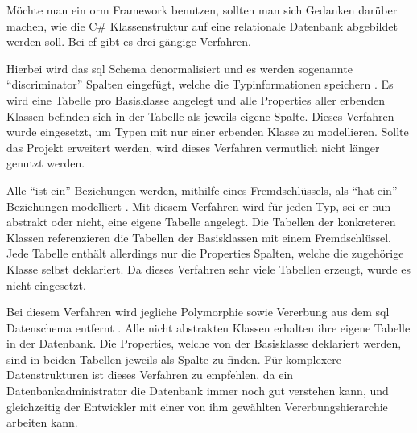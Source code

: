 
Möchte man ein \gls{orm} Framework benutzen, sollten man sich Gedanken darüber machen, wie die C\# Klassenstruktur auf eine relationale Datenbank abgebildet werden soll. Bei \gls{ef} gibt es drei gängige Verfahren.

Hierbei wird das \gls{sql} Schema denormalisiert und es werden sogenannte \enquote{discriminator} Spalten eingefügt, welche die Typinformationen speichern \cite{efTPH}. Es wird eine Tabelle pro Basisklasse angelegt und alle Properties aller erbenden Klassen befinden sich in der Tabelle als jeweils eigene Spalte. Dieses Verfahren wurde eingesetzt, um Typen mit nur einer erbenden Klasse zu modellieren. Sollte das Projekt erweitert werden, wird dieses Verfahren vermutlich nicht länger genutzt werden.

Alle \enquote{ist ein} Beziehungen werden, mithilfe eines Fremdschlüssels, als \enquote{hat ein} Beziehungen modelliert \cite{efTPT}. Mit diesem Verfahren wird für jeden Typ, sei er nun abstrakt oder nicht, eine eigene Tabelle angelegt. Die Tabellen der konkreteren Klassen referenzieren die Tabellen der Basisklassen mit einem Fremdschlüssel. Jede Tabelle enthält allerdings nur die Properties \bzw Spalten, welche die zugehörige Klasse selbst deklariert. Da dieses Verfahren sehr viele Tabellen erzeugt, wurde es nicht eingesetzt.

Bei diesem Verfahren wird jegliche Polymorphie sowie Vererbung aus dem \gls{sql} Datenschema entfernt \cite{efTPC}. Alle nicht abstrakten Klassen erhalten ihre eigene Tabelle in der Datenbank. Die Properties, welche von der Basisklasse deklariert werden, sind in beiden Tabellen jeweils als Spalte zu finden. Für komplexere Datenstrukturen ist dieses Verfahren zu empfehlen, da ein Datenbankadministrator die Datenbank immer noch gut verstehen kann, und gleichzeitig der Entwickler mit einer von ihm gewählten Vererbungshierarchie arbeiten kann.
